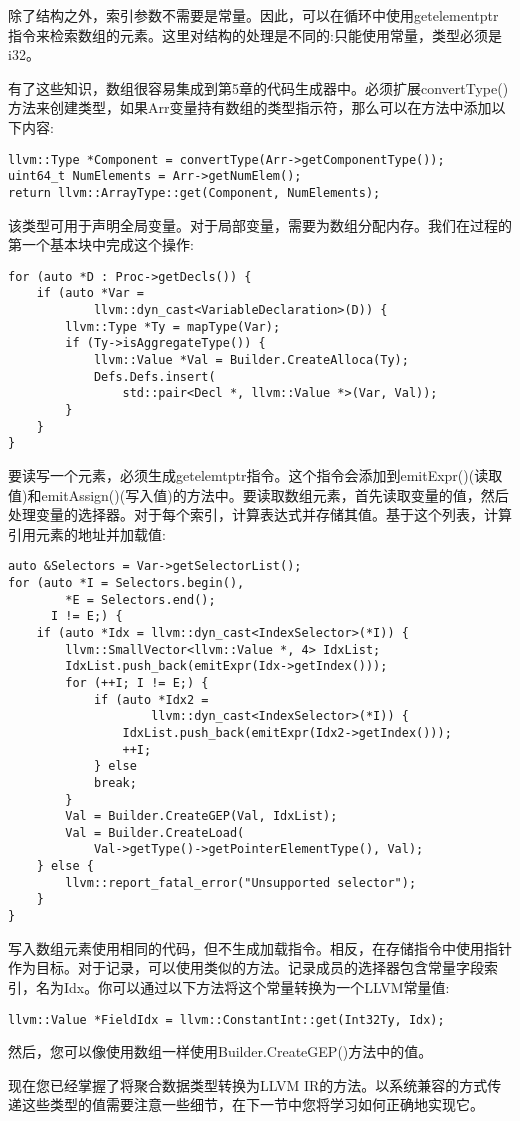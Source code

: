除了结构之外，索引参数不需要是常量。因此，可以在循环中使用getelementptr指令来检索数组的元素。这里对结构的处理是不同的:只能使用常量，类型必须是i32。\par

有了这些知识，数组很容易集成到第5章的代码生成器中。必须扩展convertType()方法来创建类型，如果Arr变量持有数组的类型指示符，那么可以在方法中添加以下内容:\par

\begin{lstlisting}[caption={}]
llvm::Type *Component = convertType(Arr->getComponentType());
uint64_t NumElements = Arr->getNumElem();
return llvm::ArrayType::get(Component, NumElements);
\end{lstlisting}

该类型可用于声明全局变量。对于局部变量，需要为数组分配内存。我们在过程的第一个基本块中完成这个操作:\par

\begin{lstlisting}[caption={}]
for (auto *D : Proc->getDecls()) {
	if (auto *Var =
			llvm::dyn_cast<VariableDeclaration>(D)) {
		llvm::Type *Ty = mapType(Var);
		if (Ty->isAggregateType()) {
			llvm::Value *Val = Builder.CreateAlloca(Ty);
			Defs.Defs.insert(
				std::pair<Decl *, llvm::Value *>(Var, Val));
		}
	}
}
\end{lstlisting}

要读写一个元素，必须生成getelemtptr指令。这个指令会添加到emitExpr()(读取值)和emitAssign()(写入值)的方法中。要读取数组元素，首先读取变量的值，然后处理变量的选择器。对于每个索引，计算表达式并存储其值。基于这个列表，计算引用元素的地址并加载值:\par

\begin{lstlisting}[caption={}]
auto &Selectors = Var->getSelectorList();
for (auto *I = Selectors.begin(),
		*E = Selectors.end();
  	  I != E;) {
	if (auto *Idx = llvm::dyn_cast<IndexSelector>(*I)) {
		llvm::SmallVector<llvm::Value *, 4> IdxList;
		IdxList.push_back(emitExpr(Idx->getIndex()));
		for (++I; I != E;) {
			if (auto *Idx2 =
					llvm::dyn_cast<IndexSelector>(*I)) {
				IdxList.push_back(emitExpr(Idx2->getIndex()));
				++I;
			} else
			break;
		}
		Val = Builder.CreateGEP(Val, IdxList);
		Val = Builder.CreateLoad(
			Val->getType()->getPointerElementType(), Val);
	} else {
		llvm::report_fatal_error("Unsupported selector");
	}
}
\end{lstlisting}

写入数组元素使用相同的代码，但不生成加载指令。相反，在存储指令中使用指针作为目标。对于记录，可以使用类似的方法。记录成员的选择器包含常量字段索引，名为Idx。你可以通过以下方法将这个常量转换为一个LLVM常量值:\par

\begin{lstlisting}[caption={}]
llvm::Value *FieldIdx = llvm::ConstantInt::get(Int32Ty, Idx);
\end{lstlisting}

然后，您可以像使用数组一样使用Builder.CreateGEP()方法中的值。\par

现在您已经掌握了将聚合数据类型转换为LLVM IR的方法。以系统兼容的方式传递这些类型的值需要注意一些细节，在下一节中您将学习如何正确地实现它。\par














